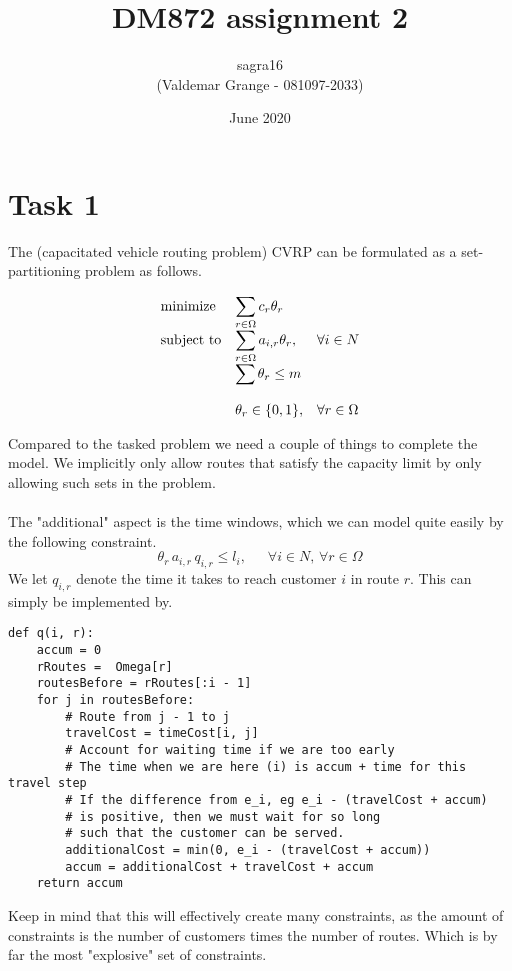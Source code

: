 \documentclass{article}
\title{DM872 assignment 2}
\author{sagra16 \\(Valdemar Grange - 081097-2033) }
\date{June 2020}
\begin{document}
    \maketitle
    
    \clearpage

    \section*{Task 1}
    The (capacitated vehicle routing problem) CVRP can be formulated as a set-partitioning problem as follows.

    \begin{equation*}
        \begin{array}{ll@{}ll}
            \text{minimize}  & \displaystyle\sum_{r \in \Omega} c_r \theta_r& &\\
            \text{subject to}& \displaystyle\sum_{r \in \Omega} a_{i, r} \theta_r ,&   &\forall i \in N\\
                             & \displaystyle\sum \theta_r \leq m &&\\\\
                             & \displaystyle \theta_r  \in \{0,1\},  && \forall r \in \Omega
        \end{array}
    \end{equation*}
    
    Compared to the tasked problem we need a couple of things to complete the model.
    We implicitly only allow routes that satisfy the capacity limit by only allowing such sets in the problem.\\\\
    The "additional" aspect is the time windows, which we can model quite easily by the following constraint.
    \[
    \theta_r \, a_{i,r} \, q_{i,r} \leq l_i   , \,\,\,\,\,\,\,\,\, \forall i \in N, \, \forall r \in \Omega
    \]
    We let $q_{i,r}$ denote the time it takes to reach customer $i$ in route $r$.
    This can simply be implemented by.
\begin{verbatim}
def q(i, r):
    accum = 0
    rRoutes =  Omega[r]
    routesBefore = rRoutes[:i - 1]
    for j in routesBefore:
        # Route from j - 1 to j
        travelCost = timeCost[i, j]
        # Account for waiting time if we are too early
        # The time when we are here (i) is accum + time for this travel step
        # If the difference from e_i, eg e_i - (travelCost + accum)
        # is positive, then we must wait for so long
        # such that the customer can be served.
        additionalCost = min(0, e_i - (travelCost + accum))
        accum = additionalCost + travelCost + accum
    return accum
\end{verbatim}
    Keep in mind that this will effectively create many constraints, as the amount of constraints is the number of customers times the number of routes.
    Which is by far the most "explosive" set of constraints.
 
\end{document}
